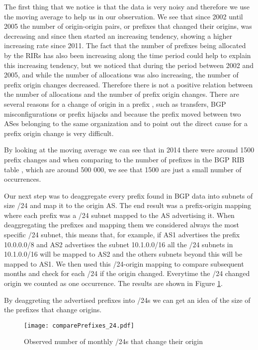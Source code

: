 \documentclass[11pt,a4paper]{scrreprt}
\begin{document}
The first thing that we notice is that the data is very noisy and therefore we use the moving average to help us in our observation. We see that since 2002 until 2005 the number of origin-origin pairs, or prefixes that changed their origins, was decreasing and since then started an increasing tendency, showing a higher increasing rate since 2011. The fact that the number of prefixes being allocated by the RIRs has also been increasing along the time period could help to explain this increasing tendency, but we noticed that during the period between 2002 and 2005, and while the number of allocations was also increasing, the number of prefix origin changes decreased. Therefore there is not a positive relation between the number of allocations and the number of prefix origin changes. There are several reasons for a change of origin in a prefix \cite{IPv4_Transfer_Markets}, such as transfers, BGP misconfigurations or prefix hijacks and because the prefix moved between two ASes belonging to the same organization and to point out the direct cause for a prefix origin change is very difficult.      

By looking at the moving average we can see that in 2014 there were around 1500 prefix changes and when comparing to the number of prefixes in the BGP RIB table \cite{Potaroo}, which are around 500 000, we see that 1500 are just a small number of occurrences.

Our next step was to deaggregate every prefix found in BGP data into subnets of size /24 and map it to the origin AS. The end result was a prefix-origin mapping where each  prefix was a /24 subnet mapped to the AS advertising it. When deaggregating the prefixes and mapping them we considered always the most specific /24 subnet, this means that, for example, if AS1 advertises the prefix 10.0.0.0/8 and AS2 advertises the subnet 10.1.0.0/16 all the /24 subnets in 10.1.0.0/16 will be mapped to AS2 and the others subnets beyond this will be mapped to AS1. We then used this /24-origin mapping to compare subsequent months and check for each /24 if the origin changed. Everytime the /24 changed origin we counted as one occurrence. The results are shown in Figure \ref{fig:comparePrefixes_24}. 

By deaggreting the advertised prefixes into /24s we can get an idea of the size of the prefixes that change origins.  

\begin{figure}[!h]
\centering
\texttt{[image: comparePrefixes\_24.pdf]}
\caption{Observed number of monthly
/24s that change their origin}
\label{fig:comparePrefixes_24}
\end{figure}
\end{document}
